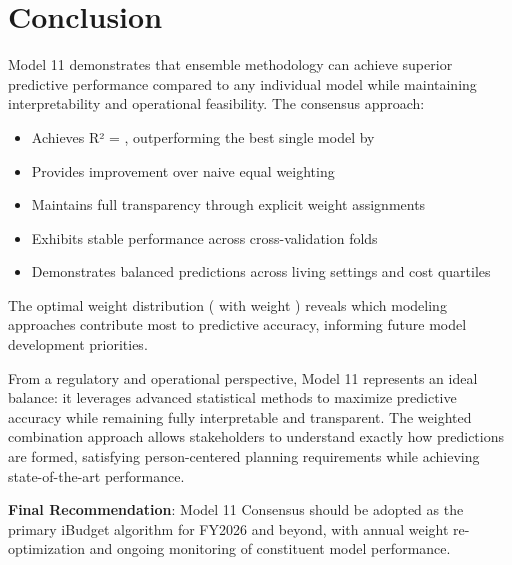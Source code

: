 \section{Conclusion}

Model 11 demonstrates that ensemble methodology can achieve superior predictive performance compared to any individual model while maintaining interpretability and operational feasibility. The consensus approach:

\begin{itemize}
    \item Achieves R² = \ModelElevenRSquaredTest{}, outperforming the best single model by \ModelElevenImprovementVsBest{}
    \item Provides \ModelElevenImprovementOverEqual{} improvement over naive equal weighting
    \item Maintains full transparency through explicit weight assignments
    \item Exhibits stable performance across cross-validation folds
    \item Demonstrates balanced predictions across living settings and cost quartiles
\end{itemize}

The optimal weight distribution (\ModelElevenTopContributor{} with weight \ModelElevenTopWeight{}) reveals which modeling approaches contribute most to predictive accuracy, informing future model development priorities.

From a regulatory and operational perspective, Model 11 represents an ideal balance: it leverages advanced statistical methods to maximize predictive accuracy while remaining fully interpretable and transparent. The weighted combination approach allows stakeholders to understand exactly how predictions are formed, satisfying person-centered planning requirements while achieving state-of-the-art performance.

\textbf{Final Recommendation}: Model 11 Consensus should be adopted as the primary iBudget algorithm for FY2026 and beyond, with annual weight re-optimization and ongoing monitoring of constituent model performance.